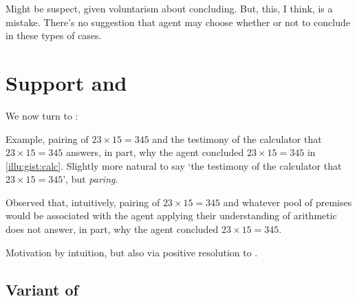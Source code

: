 \begin{note}
  Might be suspect, given voluntarism about concluding.
  But, this, I think, is a mistake.
  There's no suggestion that agent may choose whether or not to conclude in these types of cases.
\end{note}

\section{Support and \qWhy{}}
\label{cha:clarification:sec:support-qWhy}
\label{cha:clar:expand:qWhy}

\begin{note}[Introduction]
  We now turn to \qWhy{}:
  \vspace{-\baselineskip}
  \begin{quote}
    \questionWhyBasic*
  \end{quote}
  Example, pairing of \(23 \times 15 = 345\) and the testimony of the calculator that \(23 \times 15 = 345\) answers, in part, why the agent concluded \(23 \times 15 = 345\) in \autoref{illu:gist:calc}.
  Slightly more natural to say `the testimony of the calculator that \(23 \times 15 = 345\)', but \emph{paring}.

  Observed that, intuitively, pairing of \(23 \times 15 = 345\) and whatever pool of premises would be associated with the agent applying their understanding of arithmetic does not answer, in part, why the agent concluded \(23 \times 15 = 345\).
\end{note}

\begin{note}
  Motivation by intuition, but also via positive resolution to \issueInclusion{}.
\end{note}

\subsection{Variant of \qWhy{}}
\label{cha:clar:expand:qWhy:variant}

